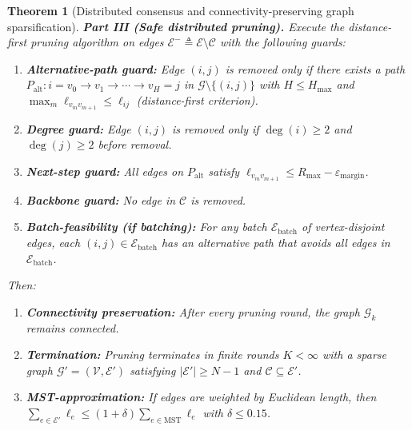 \documentclass[conference]{IEEEconf}
\theoremstyle{plain}
\newtheorem{theorem}{Theorem} %
\begin{document}
\begin{theorem}[Distributed consensus and connectivity-preserving graph sparsification]
\medskip
\noindent\textbf{Part III (Safe distributed pruning).}
Execute the distance-first pruning algorithm on edges $\mathcal{E}^-\triangleq\mathcal{E}\setminus\mathcal{C}$ with the following guards:
\begin{enumerate}[label=(\roman*)]
\item \textbf{Alternative-path guard:} Edge $(i,j)$ is removed only if there exists a path $P_{\mathrm{alt}}:i=v_0\to v_1\to\cdots\to v_H=j$ in $\mathcal{G}\setminus\{(i,j)\}$ with $H\le H_{\max}$ and $\max_{m}\ell_{v_m v_{m+1}}\le\ell_{ij}$ (distance-first criterion).
\item \textbf{Degree guard:} Edge $(i,j)$ is removed only if $\deg(i)\ge 2$ and $\deg(j)\ge 2$ before removal.
\item \textbf{Next-step guard:} All edges on $P_{\mathrm{alt}}$ satisfy $\ell_{v_m v_{m+1}}\le R_{\max}-\varepsilon_{\mathrm{margin}}$.
\item \textbf{Backbone guard:} No edge in $\mathcal{C}$ is removed.
\item \textbf{Batch-feasibility (if batching):} For any batch $\mathcal{E}_{\mathrm{batch}}$ of vertex-disjoint edges, each $(i,j)\in\mathcal{E}_{\mathrm{batch}}$ has an alternative path that avoids all edges in $\mathcal{E}_{\mathrm{batch}}$.
\end{enumerate}

Then:
\begin{enumerate}[label=\arabic*.]
\item \textbf{Connectivity preservation:} After every pruning round, the graph $\mathcal{G}_k$ remains connected.
\item \textbf{Termination:} Pruning terminates in finite rounds $K<\infty$ with a sparse graph $\mathcal{G}'=(\mathcal{V},\mathcal{E}')$ satisfying $|\mathcal{E}'|\ge N-1$ and $\mathcal{C}\subseteq\mathcal{E}'$.
\item \textbf{MST-approximation:} If edges are weighted by Euclidean length, then $\sum_{e\in\mathcal{E}'}\ell_e\le(1+\delta)\sum_{e\in\mathrm{MST}}\ell_e$ with $\delta\le 0.15$.
\end{enumerate}
\end{theorem}
\end{document}
